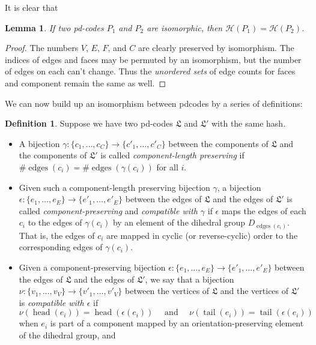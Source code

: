\documentclass[amsmath,secnumarabic,amssymb,floatfix,nofootinbib,nobibnotes,letterpaper,11pt,tightenlines,showkeys]{revtex4}
\newtheorem{lemma}[theorem]{Lemma}
\theoremstyle{definition}
\newtheorem{definition}[theorem]{Definition}
\newcommand{\pdcodes}{pd-codes }
\newcommand{\edges}{\operatorname{edges}}
\newcommand{\head}{\operatorname{head}}
\newcommand{\tail}{\operatorname{tail}}
\begin{document}
It is clear that
\begin{lemma}
If two \pdcodes $P_1$ and $P_2$ are isomorphic, then $\mathcal{H}(P_1) = \mathcal{H}(P_2)$.
\end{lemma}

\begin{proof}
The numbers $V$, $E$, $F$, and $C$ are clearly preserved by isomorphism. The indices of edges and faces may be permuted by an isomorphism, but the number of edges on each can't change. Thus the \emph{unordered sets} of edge counts for faces and component remain the same as well.
\end{proof}

We can now build up an isomorphism between pdcodes by a series of definitions:

\begin{definition}
Suppose we have two pd-codes $\mathfrak{L}$ and $\mathfrak{L}'$ with the same hash.
\begin{itemize}
\item A bijection $\gamma: \{c_1,\dots,c_C\} \rightarrow \{c'_1,\dots,c'_C\}$ between the components of $\mathfrak{L}$ and the components of $\mathfrak{L}'$ is called \emph{component-length preserving} if $\# \edges(c_i) = \# \edges(\gamma(c_i))$ for all $i$.
\item Given such a component-length preserving bijection $\gamma$, a bijection $\epsilon : \{e_1,\dots,e_E\} \rightarrow \{e'_1,\dots,e'_E\}$ between the edges of $\mathfrak{L}$ and the edges of $\mathfrak{L}'$ is called \emph{component-preserving} and \emph{compatible with $\gamma$} if $\epsilon$ maps the edges of each $c_i$ to the edges of $\gamma(c_i)$ by an element of the dihedral group $D_{\edges(c_i)}$. That is, the edges of $c_i$ are mapped in cyclic (or reverse-cyclic) order to the corresponding edges of $\gamma(c_i)$.
\item Given a component-preserving bijection $\epsilon : \{e_1,\dots,e_E\} \rightarrow \{e'_1,\dots,e'_E\}$ between the edges of $\mathfrak{L}$ and the edges of $\mathfrak{L}'$, we say that a bijection $\nu : \{v_1, \dots, v_V\} \rightarrow \{v'_1,\dots,v'_V\}$ between the vertices of $\mathfrak{L}$ and the vertices of $\mathfrak{L}'$ is \emph{compatible with $\epsilon$} if
\begin{equation*}
\nu(\head(e_i)) = \head(\epsilon(e_i)) \quad \text{ and } \quad \nu(\tail(e_i)) = \tail(\epsilon(e_i))
\end{equation*}
when $e_i$ is part of a component mapped by an orientation-preserving element of the dihedral group, and

\end{itemize}
\end{definition}
\end{document}
